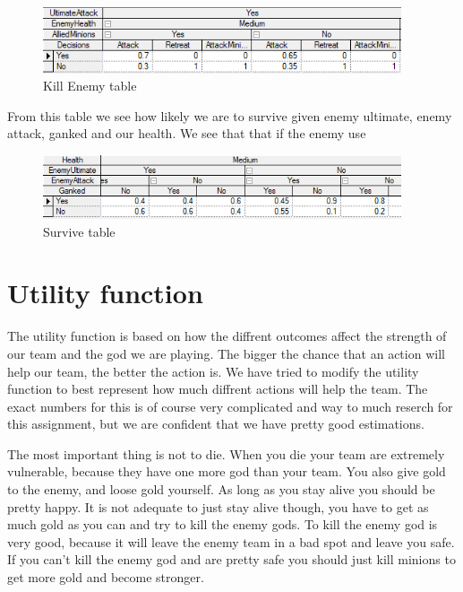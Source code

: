 \documentclass[titlepage]{article}
\begin{document}
\begin{figure}[H]
\includegraphics[width=400px]{KillEnemy.PNG}
\caption{Kill Enemy table}
\label{fig:KillEnemy}
\end{figure}

From this table we see how likely we are to survive given enemy ultimate, enemy attack, ganked and our health.
We see that that if the enemy use  

\begin{figure}[H]
\includegraphics[width=400px]{SurviveTable.PNG}
\caption{Survive table}
\label{fig:Survive}
\end{figure}


\newpage

\section{Utility function}The utility function is based on how the diffrent outcomes affect the strength of our team and the god we are playing. The bigger the chance that an action will help our team, the better the action is. We have tried to modify the utility function to best represent how much diffrent actions will help the team. The exact numbers for this is of course very complicated and way to much reserch for this assignment, but we are confident that we have pretty good estimations. 

The most important thing is not to die. When you die your team are extremely vulnerable, because they have one more god than your team. You also give gold to the enemy, and loose gold yourself. As long as you stay alive you should be pretty happy. It is not adequate to just stay alive though, you have to get as much gold as you can and try to kill the enemy gods. To kill the enemy god is very good, because it will leave the enemy team in a bad spot and leave you safe. If you can't kill the enemy god and are pretty safe you should just kill minions to get more gold and become stronger.
\end{document}
